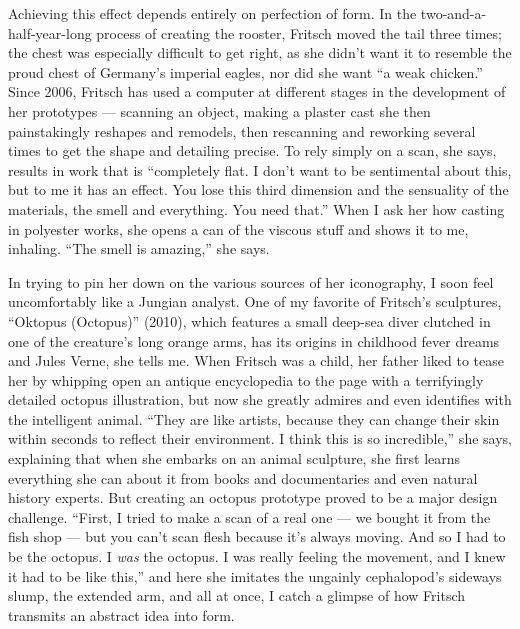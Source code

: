Achieving this effect depends entirely on perfection of form. In the
two-and-a-half-year-long process of creating the rooster, Fritsch moved
the tail three times; the chest was especially difficult to get right,
as she didn't want it to resemble the proud chest of Germany's imperial
eagles, nor did she want ``a weak chicken.'' Since 2006, Fritsch has
used a computer at different stages in the development of her prototypes
--- scanning an object, making a plaster cast she then painstakingly
reshapes and remodels, then rescanning and reworking several times to
get the shape and detailing precise. To rely simply on a scan, she says,
results in work that is ``completely flat. I don't want to be
sentimental about this, but to me it has an effect. You lose this third
dimension and the sensuality of the materials, the smell and everything.
You need that.'' When I ask her how casting in polyester works, she
opens a can of the viscous stuff and shows it to me, inhaling. ``The
smell is amazing,'' she says.

In trying to pin her down on the various sources of her iconography, I
soon feel uncomfortably like a Jungian analyst. One of my favorite of
Fritsch's sculptures, ``Oktopus (Octopus)'' (2010), which features a
small deep-sea diver clutched in one of the creature's long orange arms,
has its origins in childhood fever dreams and Jules Verne, she tells me.
When Fritsch was a child, her father liked to tease her by whipping open
an antique encyclopedia to the page with a terrifyingly detailed octopus
illustration, but now she greatly admires and even identifies with the
intelligent animal. ``They are like artists, because they can change
their skin within seconds to reflect their environment. I think this is
so incredible,'' she says, explaining that when she embarks on an animal
sculpture, she first learns everything she can about it from books and
documentaries and even natural history experts. But creating an octopus
prototype proved to be a major design challenge. ``First, I tried to
make a scan of a real one --- we bought it from the fish shop --- but
you can't scan flesh because it's always moving. And so I had to be the
octopus. I \emph{was} the octopus. I was really feeling the movement,
and I knew it had to be like this,'' and here she imitates the ungainly
cephalopod's sideways slump, the extended arm, and all at once, I catch
a glimpse of how Fritsch transmits an abstract idea into form.

